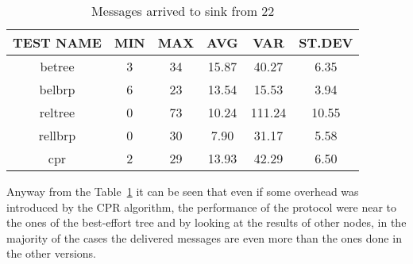 \documentclass{article}
\begin{document}
		\begin{table}[H]
			\begin{center}
			    \begin{tabular}{|c|c|c|c|c|c|}
				    \hline
				    TEST NAME & MIN & MAX & AVG & VAR & ST.DEV\\ \hline
					betree & 3 & 34 & 15.87 & 40.27 & 6.35\\ \hline
					belbrp & 6 & 23 & 13.54 & 15.53 & 3.94\\ \hline
					reltree & 0 & 73 & 10.24 & 111.24 & 10.55\\ \hline
					rellbrp & 0 & 30 & 7.90 & 31.17 & 5.58\\ \hline
					cpr & 2 & 29 & 13.93 & 42.29 & 6.50\\ \hline
			    \end{tabular}
			\end{center}	
			\caption{Messages arrived to sink from 22}
			\label{tab:25Arrivals22}
		\end{table}

Anyway from the Table~\ref{tab:25Arrivals22} it can be seen that even if some overhead was introduced by the CPR algorithm, the performance of the protocol were near to the ones of the best-effort tree and by looking at the results of other nodes, in the majority of the cases the delivered messages are even more than the ones done in the other versions.


\end{document}
